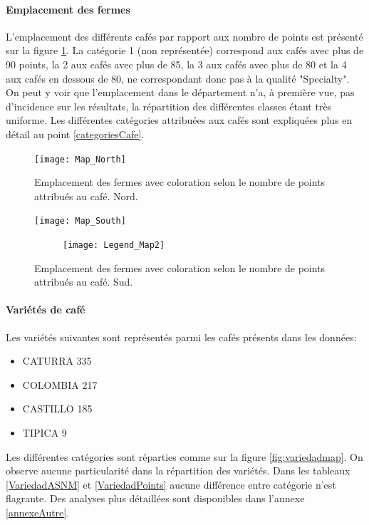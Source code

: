 \paragraph{Emplacement des fermes}\label{EmpFermes} L'emplacement des différents cafés par rapport aux nombre de points est présenté sur la figure \ref{FincaVSPoints}. La catégorie 1 (non représentée) correspond aux cafés avec plus de 90 points, la 2 aux cafés avec plus de 85, la 3 aux cafés avec plus de 80 et la 4 aux cafés en dessous de 80, ne correspondant donc pas à la qualité "Specialty". On peut y voir que l'emplacement dans le département n'a, à première vue, pas d'incidence sur les résultats, la répartition des différentes classes étant très uniforme. Les différentes catégories attribuées aux cafés sont expliquées plus en détail au point \ref{categoriesCafe}.



\begin{figure}[H]
	\texttt{[image: Map\_North]}
	\caption{Emplacement des fermes avec coloration selon le nombre de points attribués au café. Nord.}
\end{figure}

\begin{figure}[H]
	\texttt{[image: Map\_South]}
	
	\begin{figure}[H]
		\texttt{[image: Legend\_Map2]}
	\end{figure}
	\caption{\label{FincaVSPoints} Emplacement des fermes avec coloration selon le nombre de points attribués au café. Sud.}
\end{figure}

\paragraph{Variétés de café} Les variétés suivantes sont représentés parmi les cafés présents dans les données: 
\begin{itemize}
	\item CATURRA     335
	\item COLOMBIA    217
	\item CASTILLO    185
	\item TIPICA        9
\end{itemize}

\noindent Les différentes catégories sont réparties comme sur la figure \ref{fig:variedadmap}. On observe aucune particularité dans la répartition des variétés. Dans les tableaux \ref{VariedadASNM} et \ref{VariedadPoints} aucune différence entre catégorie n'est flagrante. Des analyses plus détaillées sont disponibles dans l'annexe \ref{annexeAutre}.

